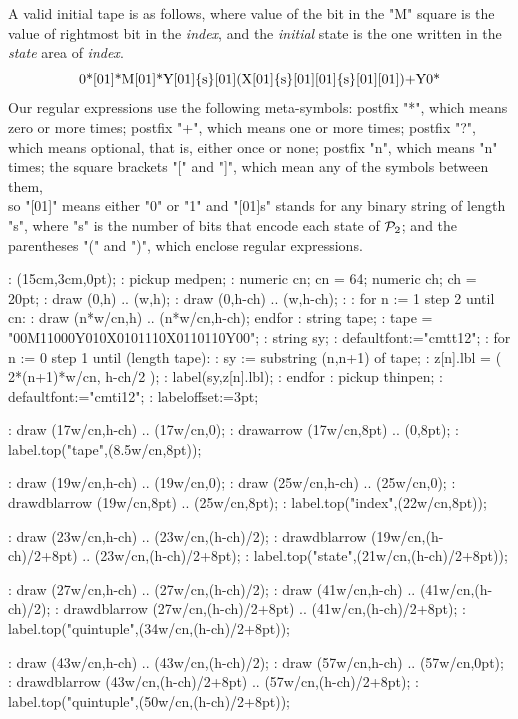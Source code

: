 A valid initial tape is as follows,
where value of the bit in the "M" square
 is the value of rightmost bit in the {\em index},
and the {\em initial} state is the one written
 in the  {\em state} area of {\em index}.
$$\catcode`\<=1 \catcode`\>=2 \catcode`\{=12 \catcode`\}=12 \tt
\hbox<0*[01]*M[01]*Y[01]{s}[01](X[01]{s}[01][01]{s}[01][01])+Y0*>
$$
Our regular expressions use the following meta-symbols:
\beginpoints
\point postfix "*", which means zero or more times;
\point postfix "+", which means one or more times;
\point postfix "?", which means optional, that is, either once or none;
\point postfix "{n}", which means "n" times;
\point the square brackets "[" and "]", which mean
 any of the symbols between them,\\
 so "[01]" means either "0" or "1"
 and "[01]{s}" stands for any binary string of length "s",
 where "s" is the number of bits that encode
 each state of ${\cal P}_2$; and
\point  the parentheses "(" and ")", which enclose regular expressions.
\endpoints

\MT:
\MTbeginfig(15cm,3cm,0pt);
\MT: pickup medpen;
\MT: numeric cn; cn = 64; numeric ch; ch = 20pt;
\MT: draw (0,h) .. (w,h);
\MT: draw (0,h-ch) .. (w,h-ch);
\MT:
\MT: for n := 1 step 2 until cn:
\MT:  draw (n*w/cn,h) .. (n*w/cn,h-ch); endfor
\MT: string tape;
\MT: tape = "00M11000Y010X0101110X0110110Y00";
\MT: string sy;
\MT: defaultfont:="cmtt12";
\MT: for n := 0 step 1 until (length tape):
\MT:  sy := substring (n,n+1) of tape;
\MT:  z[n].lbl = ( 2*(n+1)*w/cn, h-ch/2 );
\MT:  label(sy,z[n].lbl);
\MT: endfor
\MT: pickup thinpen;
\MT: defaultfont:="cmti12";
\MT: labeloffset:=3pt;

\MT: draw (17w/cn,h-ch) .. (17w/cn,0);
\MT: drawarrow  (17w/cn,8pt) .. (0,8pt);
\MT: label.top("tape",(8.5w/cn,8pt));

\MT: draw (19w/cn,h-ch) .. (19w/cn,0);
\MT: draw (25w/cn,h-ch) .. (25w/cn,0);
\MT: drawdblarrow  (19w/cn,8pt) .. (25w/cn,8pt);
\MT: label.top("index",(22w/cn,8pt));

\MT: draw (23w/cn,h-ch) .. (23w/cn,(h-ch)/2);
\MT: drawdblarrow  (19w/cn,(h-ch)/2+8pt) .. (23w/cn,(h-ch)/2+8pt);
\MT: label.top("state",(21w/cn,(h-ch)/2+8pt));

\MT: draw (27w/cn,h-ch) .. (27w/cn,(h-ch)/2);
\MT: draw (41w/cn,h-ch) .. (41w/cn,(h-ch)/2);
\MT: drawdblarrow  (27w/cn,(h-ch)/2+8pt) .. (41w/cn,(h-ch)/2+8pt);
\MT: label.top("quintuple",(34w/cn,(h-ch)/2+8pt));

\MT: draw (43w/cn,h-ch) .. (43w/cn,(h-ch)/2);
\MT: draw (57w/cn,h-ch) .. (57w/cn,0pt);
\MT: drawdblarrow  (43w/cn,(h-ch)/2+8pt) .. (57w/cn,(h-ch)/2+8pt);
\MT: label.top("quintuple",(50w/cn,(h-ch)/2+8pt));


